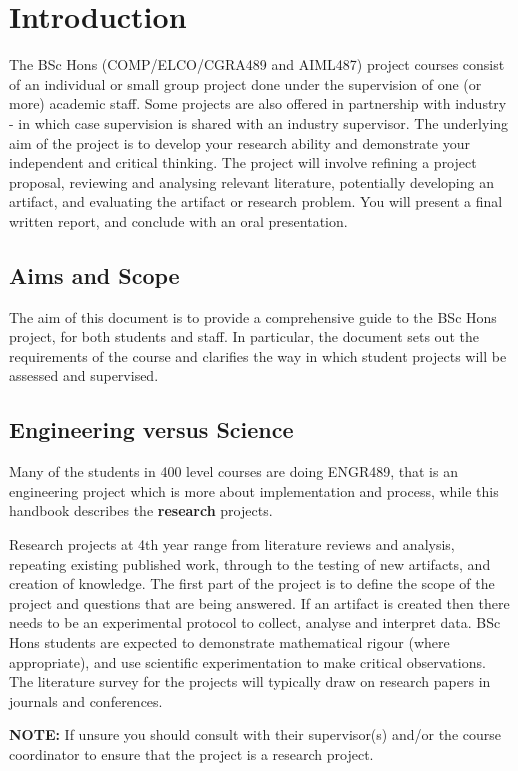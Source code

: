 \chapter{Introduction}
The BSc Hons (COMP/ELCO/CGRA489 and AIML487) project courses consist of an individual or small 
group project
done under the supervision of one (or more) academic staff.  Some projects
are also offered in partnership with industry - in which case
supervision is shared with an industry supervisor.  The underlying
aim of the project is to develop your research ability and demonstrate your independent  
and critical thinking.  The project will involve refining a project proposal, reviewing and analysing relevant literature, potentially developing an artifact, and evaluating the artifact or research problem.  
You will present a final written report, and conclude with
an oral presentation.

\section{Aims and Scope}
The aim of this document is to provide a comprehensive guide to the BSc Hons  project, for both students and staff. In
particular, the document sets out the requirements of the course and clarifies the way in which student projects 
will be assessed and supervised.

\section{Engineering versus Science}
Many of the students in 400 level courses are doing ENGR489, that is an engineering project which is more about implementation and process, while this handbook describes the
\textbf{research} projects.

Research projects at 4th year range from literature reviews and analysis, repeating existing published work, through to the testing of new artifacts, and creation of knowledge.  The first part of the project is to define the scope of the project and questions that are being answered.
If an artifact is created then there needs to be an experimental protocol to collect, 
analyse and interpret data. BSc Hons students are expected to
  demonstrate mathematical rigour (where appropriate), and use
  scientific experimentation to make critical observations. The literature
  survey for the projects will typically draw on research papers in journals
  and conferences.

{\bf NOTE:} If unsure you should consult with their supervisor(s) and/or
the course coordinator to ensure that the project is a research project.


